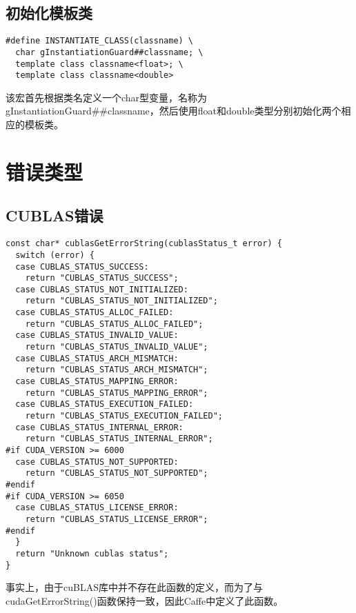 \subsection{初始化模板类}\label{common/macro/instantiate}
\begin{verbatim}
#define INSTANTIATE_CLASS(classname) \
  char gInstantiationGuard##classname; \
  template class classname<float>; \
  template class classname<double>
\end{verbatim}
该宏首先根据类名定义一个char型变量，名称为gInstantiationGuard\#\#classname，然后使用float和double类型分别初始化两个相应的模板类。

\section{错误类型}
\subsection{CUBLAS错误}\label{common/err/cublas}
\begin{verbatim}
const char* cublasGetErrorString(cublasStatus_t error) {
  switch (error) {
  case CUBLAS_STATUS_SUCCESS:
    return "CUBLAS_STATUS_SUCCESS";
  case CUBLAS_STATUS_NOT_INITIALIZED:
    return "CUBLAS_STATUS_NOT_INITIALIZED";
  case CUBLAS_STATUS_ALLOC_FAILED:
    return "CUBLAS_STATUS_ALLOC_FAILED";
  case CUBLAS_STATUS_INVALID_VALUE:
    return "CUBLAS_STATUS_INVALID_VALUE";
  case CUBLAS_STATUS_ARCH_MISMATCH:
    return "CUBLAS_STATUS_ARCH_MISMATCH";
  case CUBLAS_STATUS_MAPPING_ERROR:
    return "CUBLAS_STATUS_MAPPING_ERROR";
  case CUBLAS_STATUS_EXECUTION_FAILED:
    return "CUBLAS_STATUS_EXECUTION_FAILED";
  case CUBLAS_STATUS_INTERNAL_ERROR:
    return "CUBLAS_STATUS_INTERNAL_ERROR";
#if CUDA_VERSION >= 6000
  case CUBLAS_STATUS_NOT_SUPPORTED:
    return "CUBLAS_STATUS_NOT_SUPPORTED";
#endif
#if CUDA_VERSION >= 6050
  case CUBLAS_STATUS_LICENSE_ERROR:
    return "CUBLAS_STATUS_LICENSE_ERROR";
#endif
  }
  return "Unknown cublas status";
}
\end{verbatim}
事实上，由于cuBLAS库中并不存在此函数的定义，而为了与cudaGetErrorString()函数保持一致，因此Caffe中定义了此函数。
